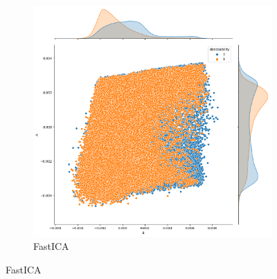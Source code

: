 \documentclass{wsdcr}
\begin{document}
\begin{figure}[H]
    \hfill
    \begin{subfigure}[b]{0.3\columnwidth} \includegraphics[width=\columnwidth]{images/FastICA.png} \caption{FastICA} \label{fig:FastICA} \end{subfigure}

\end{figure}
\end{document}

